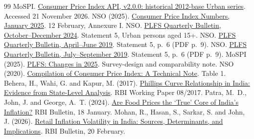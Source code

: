 \documentclass[10pt,a4paper]{article}
\begin{document}
\par\medskip
\begin{minipage}{\linewidth}
\begingroup{}
\begin{thebibliography}{99}\fontsize{9}{10.8}\selectfont
\setlength{\itemsep}{2pt}\setlength{\parskip}{0pt}
 MoSPI. \href{https://esankhyiki.mospi.gov.in/macroindicators?product=cpi&tab=api}{Consumer Price Index API, v2.0.0: historical 2012-base Urban series}. Accessed 21 November 2026.
 NSO (2025). \href{https://www.mospi.gov.in/sites/default/files/press_release/CPI_PR_12Feb25.pdf}{Consumer Price Index Numbers, January 2025}. 12 February, Annexure I.
 NSO. \href{https://mospi.gov.in/sites/default/files/publication_reports/PLFS_Quarterly_Bulletin_Oct-Dec24.pdf}{PLFS Quarterly Bulletin, October--December 2024}. Statement 5, Urban persons aged 15+.
 NSO. \href{https://www.mospi.gov.in/sites/default/files/publication_reports/Quarterly_Bulletin_PLFS_April_June_2019_M_0.pdf}{PLFS Quarterly Bulletin, April--June 2019}. Statement 5, p.~6 (PDF p.~9).
 NSO. \href{https://mospi.gov.in/sites/default/files/publication_reports/Quarterly_Bulletin_July_September_2019_M.pdf}{PLFS Quarterly Bulletin, July--September 2019}. Statement 5, p.~6 (PDF p.~9).
 MoSPI (2025). \href{https://www.mospi.gov.in/sites/default/files/publication_reports/PLFS_Changes-in-2025_rev.pdf}{PLFS: Changes in 2025}. Survey-design and comparability note.
 NSO (2020). \href{https://www.mospi.gov.in/sites/default/files/press_release/CPI%20Technical%20Note%20on%20Imputation.pdf}{Compilation of Consumer Price Index: A Technical Note}. Table 1.
 Behera, H., Wahi, G. and Kapur, M. (2017). \href{https://rbi.org.in/Scripts/PublicationsView.aspx?id=17752}{Phillips Curve Relationship in India: Evidence from State-Level Analysis}. RBI Working Paper 08/2017.
 Patra, M.~D., John, J. and George, A.~T. (2024). \href{https://rbi.org.in/Scripts/BS_ViewBulletin.aspx?Id=22323}{Are Food Prices the `True' Core of India's Inflation?} RBI Bulletin, 18 January.
 Mohan, R., Hasan, S., Sarkar, S. and John, J. (2026). \href{https://www.rbi.org.in/Scripts/BS_ViewBulletin.aspx?Id=23980}{Retail Inflation Volatility in India: Sources, Determinants, and Implications}. RBI Bulletin, 20 February.
\end{thebibliography}
\endgroup
\end{minipage}
\end{document}
